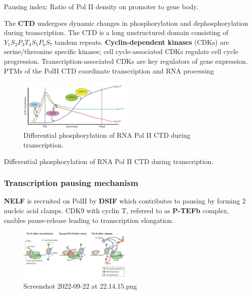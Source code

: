 Pausing index: Ratio of Pol II density on promoter to gene body.

The \textbf{CTD} undergoes dynamic changes in phosphorylation and dephosphorylation during transcription. The CTD is a long unstructured domain consisting of \(Y_1S_2P_3T_4S_5P_6S_7\) tandem repeats. \textbf{Cyclin-dependent kinases} (CDKs) are serine/threonine specific kinases; cell cycle-associated CDKs regulate cell cycle progression. Transcription-associated CDKs are key regulators of gene expression. PTMs of the PolII CTD coordinate transcription and RNA processing

\begin{figure}
\centering
\includegraphics[width=0.5\textwidth]{../_resources/Screenshot_2022-09-22_at_22-09-19.png}
\caption{Differential phosphorylation of RNA Pol II CTD during transcription.}
\end{figure}

Differential phosphorylation of RNA Pol II CTD during transcription.

\hypertarget{transcription-pausing-mechanism}{%
\subsubsection{Transcription pausing mechanism}\label{transcription-pausing-mechanism}}

\textbf{NELF} is recruited on PolII by \textbf{DSIF} which contributes to pausing by forming 2 nucleic acid clamps. CDK9 with cyclin T, referred to as \textbf{P-TEFb} complex, enables pause-release leading to transcription elongation.

\begin{figure}
\centering
\includegraphics[width=0.5\textwidth]{../_resources/Screenshot_2022-09-22_at_22-14-15.png}
\caption{Screenshot 2022-09-22 at 22.14.15.png}
\end{figure}


